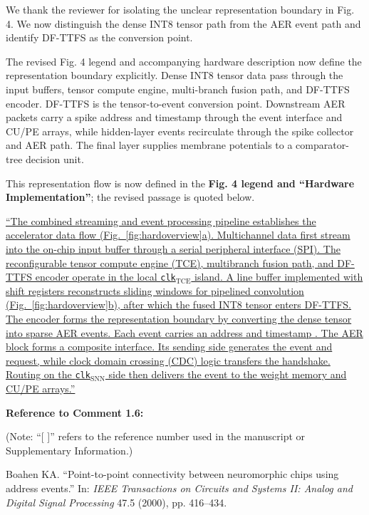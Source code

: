 \documentclass[12pt,technote,onecolumn]{IEEEtran}
\begin{document}

We thank the reviewer for isolating the unclear representation boundary in Fig. 4. We now distinguish the dense INT8 tensor path from the AER event path and identify DF-TTFS as the conversion point.

The revised Fig. 4 legend and accompanying hardware description now
define the representation boundary explicitly. Dense INT8 tensor data
pass through the input buffers, tensor compute engine, multi-branch
fusion path, and DF-TTFS encoder. DF-TTFS is the tensor-to-event
conversion point. Downstream AER packets carry a spike address and
timestamp through the event interface and CU/PE arrays, while
hidden-layer events recirculate through the spike collector and AER
path. The final layer supplies membrane potentials to a comparator-tree
decision unit.



This representation flow is now defined in the \textbf{Fig. 4 legend and ``Hardware Implementation''}; the revised passage is quoted below.

\uline{``The combined streaming and event processing pipeline establishes the accelerator data flow (Fig.~\ref{fig:hardoverview}a). Multichannel data first stream into the on-chip input buffer through a serial peripheral interface (SPI). The reconfigurable tensor compute engine (TCE), multibranch fusion path, and DF-TTFS encoder operate in the local \texttt{clk}$_{\mathrm{TCE}}$ island. A line buffer implemented with shift registers reconstructs sliding windows for pipelined convolution (Fig.~\ref{fig:hardoverview}b), after which the fused INT8 tensor enters DF-TTFS. The encoder forms the representation boundary by converting the dense tensor into sparse AER events. Each event carries an address and timestamp \cite{AER}. The AER block forms a composite interface. Its sending side generates the event and request, while clock domain crossing (CDC) logic transfers the handshake. Routing on the \texttt{clk}$_{\mathrm{SNN}}$ side then delivers the event to the weight memory and CU/PE arrays.''}

\EvidenceMainFigFour

\noindent \textbf{Reference to Comment 1.6:}

\noindent(Note: ``[ ]'' refers to the reference number used in the manuscript or Supplementary Information.)

\noindent[43]\:Boahen KA. ``Point-to-point connectivity between neuromorphic chips using address events.'' In: \textit{IEEE Transactions on Circuits and Systems II: Analog and Digital Signal Processing} 47.5 (2000), pp. 416--434.
\end{document}
